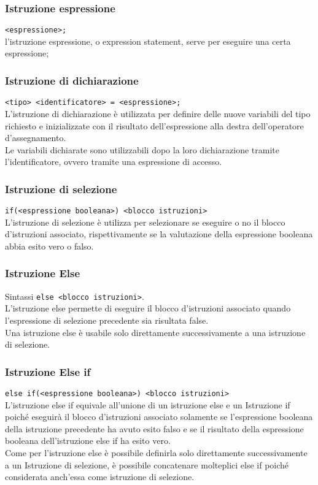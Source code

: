 \subsubsection{Istruzione espressione}
\lstinline|<espressione>;| \\
l'istruzione espressione, o expression statement, serve per eseguire una certa espressione; 


\subsubsection{Istruzione di dichiarazione}
\lstinline|<tipo> <identificatore> = <espressione>;| \\
L'istruzione di dichiarazione è utilizzata per definire delle nuove variabili del tipo 
richiesto e inizializzate con il risultato dell'espressione alla destra dell'operatore d'assegnamento. \\
Le variabili dichiarate sono utilizzabili dopo la loro dichiarazione tramite l'identificatore, ovvero
tramite una espressione di accesso. 

\subsubsection{Istruzione di selezione}
\lstinline|if(<espressione booleana>) <blocco istruzioni>| \\
L'istruzione di selezione è utilizza per selezionare se eseguire o no il blocco d'istruzioni
associato, rispettivamente se la valutazione della espressione booleana abbia esito vero o falso.

\subsubsection{Istruzione Else}
Sintassi \lstinline|else <blocco istruzioni>|. \\
L'istruzione else permette di eseguire il blocco d'istruzioni associato quando l'espressione
di selezione precedente sia risultata false. \\
Una istruzione else è usabile solo direttamente successivamente a una istruzione di selezione.

\subsubsection{Istruzione Else if}
\lstinline|else if(<espressione booleana>) <blocco istruzioni>| \\
L'istruzione else if equivale all'unione di un istruzione else e un Istruzione if poiché 
eseguirà il blocco d'istruzioni associato solamente se l'espressione booleana della 
istruzione precedente ha avuto esito falso e se il risultato della espressione booleana 
dell'istruzione else if ha esito vero. \\
Come per l'istruzione else è possibile definirla solo direttamente successivamente a un Istruzione 
di selezione, è possibile concatenare molteplici else if poiché considerata anch'essa come 
istruzione di selezione.

